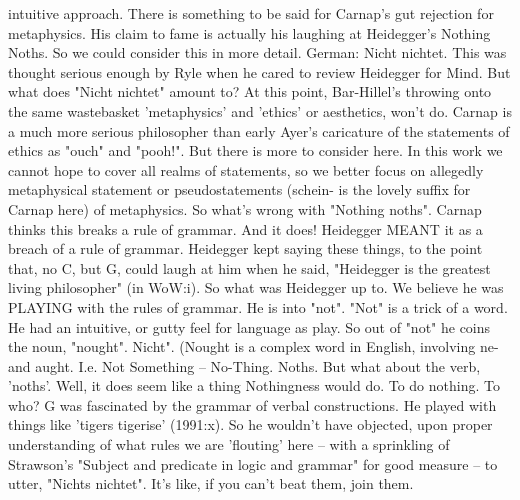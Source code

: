 \documentclass[10pt,titlepage]{book}
\begin{document}
intuitive approach. There is something to be said for Carnap's gut  
rejection for metaphysics. His claim to fame is actually his laughing at  
Heidegger's Nothing Noths. So we could consider this in more detail. German:  Nicht 
nichtet. This was thought serious enough by Ryle when he cared to review  
Heidegger for Mind. But what does "Nicht nichtet" amount to? At this point,  
Bar-Hillel's throwing onto the same wastebasket 'metaphysics' and 'ethics' or  
aesthetics, won't do. Carnap is a much more serious philosopher than early  
Ayer's caricature of the statements of ethics as "ouch" and "pooh!". But 
there  is more to consider here. In this work we cannot hope to cover all 
realms of  statements, so we better focus on allegedly metaphysical statement or 
 pseudostatements (schein- is the lovely suffix for Carnap here) of 
metaphysics.  So what's wrong with "Nothing noths". Carnap thinks this breaks a 
rule of  grammar. And it does! Heidegger MEANT it as a breach of a rule of 
grammar.  Heidegger kept saying these things, to the point that, no C, but G, 
could laugh  at him when he said, "Heidegger is the greatest living 
philosopher" (in WoW:i).  So what was Heidegger up to. We believe he was PLAYING with 
the rules of  grammar. He is into "not". "Not" is a trick of a word. He had 
an intuitive, or  gutty feel for language as play. So out of "not" he coins 
the noun, "nought".  Nicht". (Nought is a complex word in English, involving 
ne- and aught. I.e. Not  Something -- No-Thing. Noths. But what about the 
verb, 'noths'. Well, it does  seem like a thing Nothingness would do. To do 
nothing. To who? G was fascinated  by the grammar of verbal constructions. He 
played with things like 'tigers  tigerise' (1991:x). So he wouldn't have 
objected, upon proper understanding of  what rules we are 'flouting' here -- 
with a sprinkling of Strawson's "Subject  and predicate in logic and grammar" 
for good measure -- to utter, "Nichts  nichtet". It's like, if you can't 
beat them, join them.
 
\end{document}
